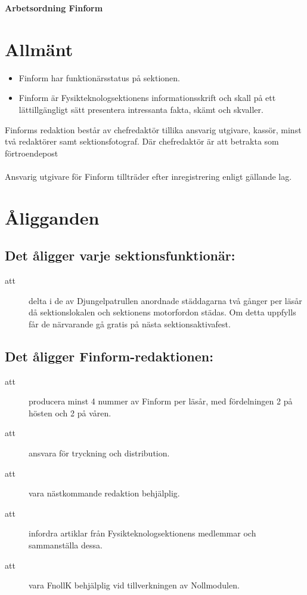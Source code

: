 

\renewcommand{\dateseparator}{-} %
\renewcommand{\forening}{Finform }

\begin{center}
\LARGE{\textbf{Arbetsordning Finform}}
\end{center}


\section{Allmänt}
\begin{itemize}
\item Finform har funktionärsstatus på sektionen.

\item Finform är Fysikteknologsektionens informationsskrift och skall på ett lättillgängligt sätt presentera intressanta fakta, skämt och skvall\-er.

\end{itemize}

Finforms redaktion består av chefredaktör tillika ansvarig utgivare, kassör, minst två redak\-tör\-er samt sektionsfotograf. Där chefredaktör är att betrakta som förtroendepost \\ \\
Ansvarig utgivare för Finform tillträder efter inregistrering enligt gällande lag.\\

\section{Åligganden}
\subsection{Det åligger varje sektionsfunktionär:}
    \begin{description}
      \item[att] delta i de av Djungelpatrullen anordnade städdagarna två gånger per
      läsår då sektionslokalen och sektionens motorfordon städas. Om detta uppfylls får de närvarande gå gratis på nästa
      sektionsaktivafest.
    \end{description}
    
\subsection{Det åligger Finform-redaktionen:}
    \begin{description}
      \item[att] producera minst 4 nummer av Finform per läsår, med för\-del\-ningen 2 på hösten och 2 på våren.
      \item[att] ansvara för tryckning och distribution.
      \item[att] vara nästkommande redaktion behjälplig.
      \item[att] infordra artiklar från Fysikteknologsektionens medlemmar och sammanställa dessa.
      \item[att] vara FnollK behjälplig vid tillverkningen av Nollmodulen.
    \end{description}


